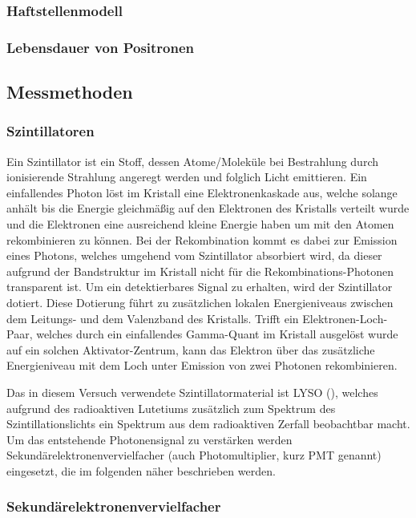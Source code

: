 \documentclass[11pt, a4paper]{article}
\numberwithin{equation}{section}
\begin{document}
\subsubsection{Haftstellenmodell}

\subsubsection{Lebensdauer von Positronen}

\subsection{Messmethoden}

\subsubsection{Szintillatoren}

Ein Szintillator ist ein Stoff, dessen Atome/Moleküle bei Bestrahlung durch ionisierende Strahlung angeregt werden und folglich Licht emittieren.
Ein einfallendes Photon löst im Kristall eine Elektronenkaskade aus, welche solange anhält bis die Energie gleichmäßig auf den Elektronen des Kristalls verteilt wurde und die Elektronen eine ausreichend kleine Energie haben um mit den Atomen rekombinieren zu können.
Bei der Rekombination kommt es dabei zur Emission eines Photons, welches umgehend vom Szintillator absorbiert wird, da dieser aufgrund der Bandstruktur im Kristall nicht für die Rekombinations-Photonen transparent ist.
Um ein detektierbares Signal zu erhalten, wird der Szintillator dotiert.
Diese Dotierung führt zu zusätzlichen lokalen Energieniveaus zwischen dem Leitungs- und dem Valenzband des Kristalls.
Trifft ein Elektronen-Loch-Paar, welches durch ein einfallendes Gamma-Quant im Kristall ausgelöst wurde auf ein solchen Aktivator-Zentrum, kann das Elektron über das zusätzliche Energieniveau mit dem Loch unter Emission von zwei Photonen rekombinieren.

Das in diesem Versuch verwendete Szintillator\-material ist LYSO (), welches aufgrund des radioaktiven Lute\-tiums zusätzlich zum Spektrum des Szin\-tillations\-lichts ein Spektrum aus dem radioaktiven Zerfall beobachtbar macht.
Um das entstehende Photonensignal zu verstärken werden Sekundärelektronenvervielfacher (auch Photomultiplier, kurz PMT genannt) eingesetzt, die im folgenden näher beschrieben werden.

\subsubsection{Sekundärelektronenvervielfacher}
\end{document}
